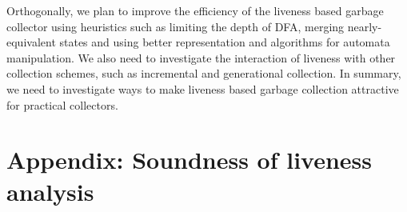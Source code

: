 \documentclass[preprint,9pt]{sigplanconf}
\begin{document}
  Orthogonally, we  plan to  improve the  efficiency of
  the liveness based garbage collector using heuristics
  such   as  limiting   the  depth   of  DFA,   merging
  nearly-equivalent    states    and    using    better
  representation    and    algorithms   for    automata
  manipulation.  We   also  need  to   investigate  the
  interaction   of  liveness   with  other   collection
  schemes,   such  as   incremental  and   generational
  collection.  In summary, we  need to investigate ways
  to make liveness  based garbage collection attractive
  for practical collectors.


{}


\clearpage
\section{Appendix: Soundness of liveness analysis}
 
\end{document}
